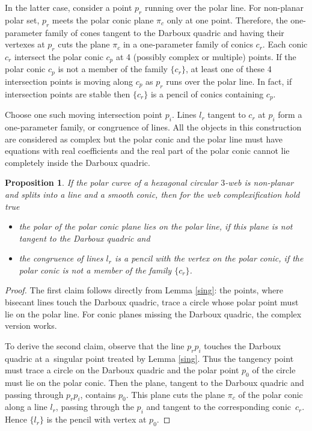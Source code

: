 \documentclass[11pt]{article}
\numberwithin{equation}{section}
\numberwithin{equation}{section}
\newtheorem{Proposition}[Theorem]{Proposition}
 { \theoremstyle{definition}
\newtheorem{Definition}[Theorem]{Definition}
\newtheorem{Note}[Theorem]{Note}
\newtheorem{Example}[Theorem]{Example}
\newtheorem{Remark}[Theorem]{Remark} }
\begin{document}
In the latter case, consider a point $p_r$ running over the polar line. For non-planar polar set, $p_r$ meets the polar conic plane $\pi_c$ only at one point. Therefore, the one-parameter family of cones tangent to the Darboux quadric and having their vertexes at $p_r$ cuts the plane $\pi_c$ in a one-parameter family of conics $c_r$. Each conic $c_r$ intersect the polar conic $c_p$ at 4 (possibly complex or multiple) points. If the polar conic $c_p$ is not a member of the family $\{c_r\}$, at least one of these 4 intersection points is moving along $c_p$ as $p_r$ runs over the polar line. In fact, if intersection points are stable then $\{c_r\}$ is a pencil of conics containing $c_p$.

Choose one such moving intersection point $p_i$. Lines $l_r$ tangent to $c_r$ at $p_i$ form a one-parameter family, or congruence of lines. All the objects in this construction are considered as complex but the polar conic and the polar line must have equations with real coefficients and the real part of the polar conic cannot lie completely inside the Darboux quadric.

\begin{Proposition}\label{geometryconic}
If the polar curve of a hexagonal circular $3$-web is non-planar and splits into a line and a smooth conic, then for the web complexification hold true
\begin{itemize}\itemsep=0pt
\item[$(1)$] the polar of the polar conic plane lies on the polar line, if this plane is not tangent to the Darboux quadric and
\item[$(2)$] the congruence of lines $l_r$ is a pencil with the vertex on the polar conic, if the polar conic is not a member of the family $\{c_r\}$.
\end{itemize}
\end{Proposition}
\begin{proof}
 The first claim follows directly from Lemma \ref{sing}: the points, where bisecant lines touch the Darboux quadric, trace a circle whose polar point must lie on the polar line. For conic planes missing the Darboux quadric, the complex version works.

To derive the second claim, observe that the line $p_rp_i$ touches the Darboux quadric at a~singular point treated by Lemma \ref{sing}. Thus the tangency point must trace a circle on the Darboux quadric and the polar point $p_0$ of the circle must lie on the polar conic. Then the plane, tangent to the Darboux quadric and passing through $p_rp_i$, contains $p_0$. This plane cuts the plane $\pi_c$ of the polar conic along a line $l_r$, passing through the $p_i$ and tangent to the corresponding conic~$c_r$. Hence $\{l_r\}$ is the pencil with vertex at $p_0$.
\end{proof}
\end{document}
